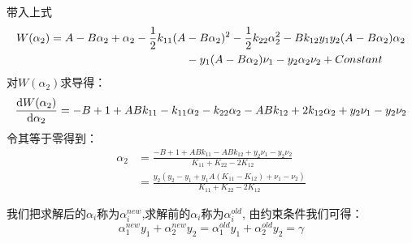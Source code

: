 \documentclass[UTF8]{ctexart}
\begin{document}
\noindent 带入上式
\begin{equation}\notag
    \begin{aligned}
        W(\alpha_2) &= A - B\alpha_2 + \alpha_2 - \frac{1}{2}k_{11}(A-B\alpha_2)^2 - \frac{1}{2}k_{22}\alpha_2^2 - Bk_{12}y_1y_2(A-B\alpha_2)\alpha_2 \\
        &\qquad \qquad \qquad \qquad \qquad \qquad - y_1(A-B\alpha_2)\nu_1 - y_2\alpha_2\nu_2 + Constant
    \end{aligned}
\end{equation}
对$W(\alpha_2)$求导得：
\begin{equation}\notag
    \begin{aligned}
        \frac{\mathrm{d}W(\alpha_2)}{\mathrm{d}\alpha_2} = -B+1+ABk_{11} - k_{11}\alpha_2 - k_{22}\alpha_2 - A B k_{12} + 2k_{12}\alpha_2 + y_2\nu_1 - y_2\nu_2
    \end{aligned}
\end{equation}
令其等于零得到：
\begin{equation}
    \begin{aligned}
        \alpha_2 &= \frac{-B+1+ABk_{11}-ABk_{12}+y_2 \nu_1 - y_2 \nu_2}{K_{11}+K_{22}-2K_{12}}\\
        &=\frac{y_2(y_2-y_1+y_1A(K_{11}-K_{12}) + \nu_1 -\nu_2)}{K_{11}+K_{22}-2K_{12}}
    \end{aligned}
\end{equation}

我们把求解后的$\alpha_i$称为$\alpha_i^{new}$,求解前的$\alpha_i$称为$\alpha_i^{old}$,
由约束条件我们可得：
$$\alpha_1^{new} y_1 + \alpha_2^{new} y_2 = \alpha_1^{old} y_1 + \alpha_2^{old} y_2 = \gamma $$
\end{document}

